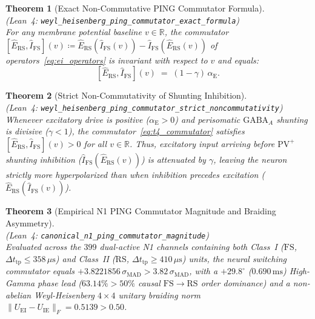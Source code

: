 \documentclass[11pt,letterpaper]{article}
\newcommand{\lean}[1]{\nolinkurl{#1}}
\newtheorem{theorem}{Theorem}[section]
\theoremstyle{definition}
\begin{document}
\begin{theorem}[Exact Non-Commutative PING Commutator Formula]
\label{thm:t4}
~\\
(\emph{Lean~4:} \lean{weyl_heisenberg_ping_commutator_exact_formula})\\
For any membrane potential baseline $v \in \mathbb{R}$, the commutator $[\hat{E}_{\mathrm{RS}}, \hat{I}_{\mathrm{FS}}](v) \coloneqq \hat{E}_{\mathrm{RS}}(\hat{I}_{\mathrm{FS}}(v)) - \hat{I}_{\mathrm{FS}}(\hat{E}_{\mathrm{RS}}(v))$ of operators~\eqref{eq:ei_operators} is invariant with respect to $v$ and equals:
\begin{equation}
\label{eq:t4_commutator}
[\hat{E}_{\mathrm{RS}}, \hat{I}_{\mathrm{FS}}](v) \;=\; (1 - \gamma)\,\alpha_{\mathrm{E}}.
\end{equation}
\end{theorem}

\begin{theorem}[Strict Non-Commutativity of Shunting Inhibition]
\label{thm:t5}
~\\
(\emph{Lean~4:} \lean{weyl_heisenberg_ping_commutator_strict_noncommutativity})\\
Whenever excitatory drive is positive ($\alpha_{\mathrm{E}} > 0$) and perisomatic $\mathrm{GABA}_A$ shunting is divisive ($\gamma < 1$), the commutator~\eqref{eq:t4_commutator} satisfies $[\hat{E}_{\mathrm{RS}}, \hat{I}_{\mathrm{FS}}](v) > 0$ for all $v \in \mathbb{R}$. Thus, excitatory input arriving before $\mathrm{PV}^+$ shunting inhibition ($\hat{I}_{\mathrm{FS}}(\hat{E}_{\mathrm{RS}}(v))$) is attenuated by $\gamma$, leaving the neuron strictly more hyperpolarized than when inhibition precedes excitation ($\hat{E}_{\mathrm{RS}}(\hat{I}_{\mathrm{FS}}(v))$).
\end{theorem}

\begin{theorem}[Empirical N1 PING Commutator Magnitude and Braiding Asymmetry]
\label{thm:t6}
~\\
(\emph{Lean~4:} \lean{canonical_n1_ping_commutator_magnitude})\\
Evaluated across the $399$ dual-active N1 channels containing both Class~I ($\mathrm{FS}$, $\Delta t_{\mathrm{tp}}\le 358\,\mu\text{s}$) and Class~II ($\mathrm{RS}$, $\Delta t_{\mathrm{tp}}\ge 410\,\mu\text{s}$) units, the neural switching commutator equals $+3.8221856\,\sigma_{\mathrm{MAD}} > 3.82\,\sigma_{\mathrm{MAD}}$, with a $+29.8^\circ$ ($0.690\,\text{ms}$) High-Gamma phase lead ($63.14\% > 50\%$ causal $\mathrm{FS}\to\mathrm{RS}$ order dominance) and a non-abelian Weyl-Heisenberg $4\times 4$ unitary braiding norm $\|U_{\mathrm{EI}} - U_{\mathrm{IE}}\|_F = 0.5139 > 0.50$.
\end{theorem}
\end{document}
